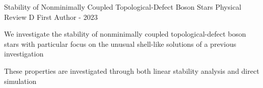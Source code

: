\begin{cventries}
    \cvskillentry
    {Stability of Nonminimally Coupled Topological-Defect Boson Stars} %
    {Physical Review D} %
    {} %
    {First Author - 2023} %
    {\begin{cvitems} %
        \item We investigate the stability of nonminimally coupled topological-defect boson stars with particular focus on the unusual shell-like solutions of a previous investigation
        \item These properties are investigated through both linear stability analysis and direct simulation
    \end{cvitems}}
    

\end{cventries}


